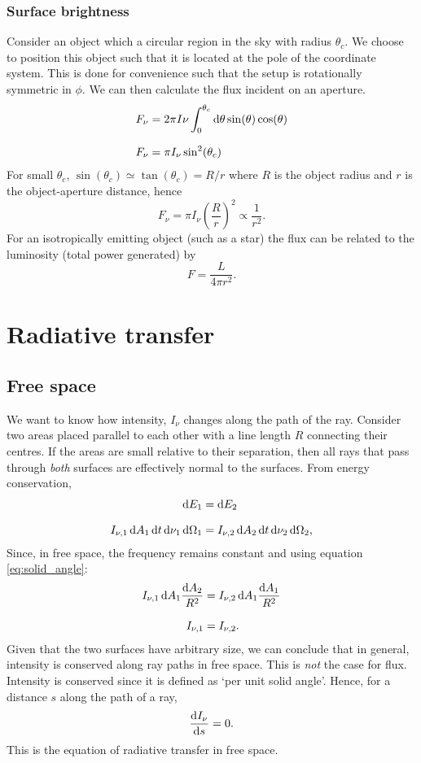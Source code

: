 \subsubsection{Surface brightness}
Consider an object which a circular region in the sky with radius $\theta_c$.
 We choose to position this object such that it is located at the pole of the coordinate system.
 This is done for convenience such that the setup is rotationally symmetric in $\phi$.
 We can then calculate the flux incident on an aperture.
%
\begin{align*}
	F_\nu &= 2\pi I\nu \int_{0}^{\theta_c}\diff\theta \sin(\theta) \cos(\theta)
	\linedrop
	F_\nu &= \pi I_\nu \sin^2(\theta_c)
\end{align*}
%
For small $\theta_c$, $\sin(\theta_c) \simeq \tan(\theta_c) = R/r$ where $R$ is the object radius and $r$ is the object-aperture distance, hence
%
$$ F_\nu = \pi I_\nu  \left( \frac{R}{r} \right) ^2 \propto \frac{1}{r^2}. $$
%
For an isotropically emitting object (such as a star) the flux can be related to the luminosity (total power generated) by
%
$$ F = \frac{L}{4\pi r^2}. $$
%
%
%
\section{Radiative transfer}
\subsection{Free space}
We want to know how intensity, $I_\nu$ changes along the path of the ray.
 Consider two areas placed parallel to each other with a line length $R$ connecting their centres.
 If the areas are small relative to their separation, then all rays that pass through \emph{both} surfaces are effectively normal to the surfaces.
 From energy conservation,
\begin{align*}
	\diff E_1 &= \diff E_2
	\linedrop
	I_{\nu ,1}\diff A_1 \diff t \diff \nu_1 \diff \Omega_1 &= I_{\nu ,2}\diff A_2 \diff t \diff \nu_2 \diff \Omega_2 ,	
\end{align*}
%
Since, in free space, the frequency remains constant and using equation \ref{eq:solid_angle}:
%
\begin{align*}
		I_{\nu ,1}\diff A_1 \frac{\diff A_2}{R^2} &= I_{\nu ,2}\diff A_1 \frac{\diff A_1}{R^2}
		\linedrop
		I_{\nu ,1} &= I_{\nu ,2}.
\end{align*}
%
Given that the two surfaces have arbitrary size, we can conclude that in general, intensity is conserved along ray paths in free space.
 This is \emph{not} the case for flux.
 Intensity is conserved since it is defined as `per unit solid angle'.
 Hence, for a distance $s$ along the path of a ray,
%
$$ \frac{\mathop{}\!\mathrm{d} I_\nu}{\mathop{}\!\mathrm{d} s} = 0. $$
%
This is the equation of radiative transfer in free space.
%
%
